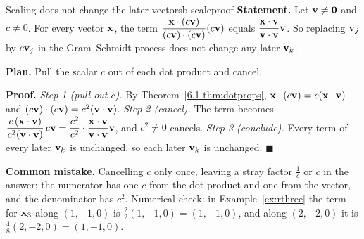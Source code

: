 \documentclass[11pt]{article}
\begin{document}
\begin{exmp}{Scaling does not change the later vectors}{b-scaleproof}
\textbf{Statement.} Let $\mathbf{v}\neq\mathbf{0}$ and $c\neq0$. For every vector $\mathbf{x}$, the term $\dfrac{\mathbf{x}\cdot(c\mathbf{v})}{(c\mathbf{v})\cdot(c\mathbf{v})}(c\mathbf{v})$ equals $\dfrac{\mathbf{x}\cdot\mathbf{v}}{\mathbf{v}\cdot\mathbf{v}}\mathbf{v}$. So replacing $\mathbf{v}_j$ by $c\mathbf{v}_j$ in the Gram--Schmidt process does not change any later $\mathbf{v}_k$.

\textbf{Plan.} Pull the scalar $c$ out of each dot product and cancel.

\textbf{Proof.}
\emph{Step 1 (pull out $c$).} By Theorem~\ref{6.1-thm:dotprops}, $\mathbf{x}\cdot(c\mathbf{v})=c(\mathbf{x}\cdot\mathbf{v})$ and $(c\mathbf{v})\cdot(c\mathbf{v})=c^2(\mathbf{v}\cdot\mathbf{v})$.
\emph{Step 2 (cancel).} The term becomes $\dfrac{c\,(\mathbf{x}\cdot\mathbf{v})}{c^2(\mathbf{v}\cdot\mathbf{v})}\,c\mathbf{v}=\dfrac{c^2}{c^2}\cdot\dfrac{\mathbf{x}\cdot\mathbf{v}}{\mathbf{v}\cdot\mathbf{v}}\mathbf{v}$, and $c^2\neq0$ cancels.
\emph{Step 3 (conclude).} Every term of every later $\mathbf{v}_k$ is unchanged, so each later $\mathbf{v}_k$ is unchanged. \qquad$\blacksquare$

\textbf{Common mistake.} Cancelling $c$ only once, leaving a stray factor $\tfrac1c$ or $c$ in the answer; the numerator has one $c$ from the dot product and one from the vector, and the denominator has $c^2$. Numerical check: in Example~\ref{ex:rthree} the term for $\mathbf{x}_3$ along $(1,-1,0)$ is $\tfrac22(1,-1,0)=(1,-1,0)$, and along $(2,-2,0)$ it is $\tfrac48(2,-2,0)=(1,-1,0)$.
\end{exmp}
\end{document}
